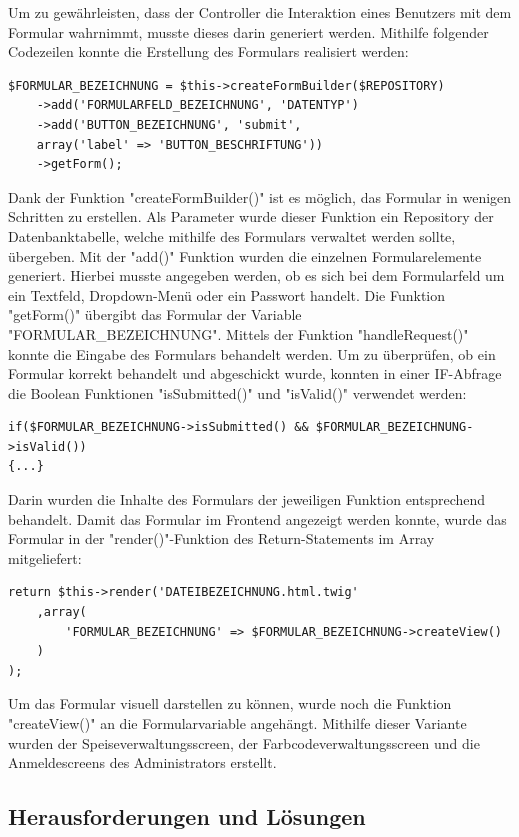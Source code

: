 Um zu gewährleisten, dass der Controller die Interaktion eines Benutzers mit dem Formular wahrnimmt, musste dieses darin generiert werden. Mithilfe folgender Codezeilen konnte die Erstellung des Formulars realisiert werden:
	\lstset{language=php}
  	\begin{lstlisting}
$FORMULAR_BEZEICHNUNG = $this->createFormBuilder($REPOSITORY)
	->add('FORMULARFELD_BEZEICHNUNG', 'DATENTYP')
	->add('BUTTON_BEZEICHNUNG', 'submit',
	array('label' => 'BUTTON_BESCHRIFTUNG'))
    ->getForm();
  	\end{lstlisting}
Dank der Funktion "createFormBuilder()" ist es möglich, das Formular in wenigen Schritten zu erstellen. Als Parameter wurde dieser Funktion ein Repository der Datenbanktabelle, welche mithilfe des Formulars verwaltet werden sollte, übergeben. Mit der "add()" Funktion wurden die einzelnen Formularelemente generiert. Hierbei musste angegeben werden, ob es sich bei dem Formularfeld um ein Textfeld, Dropdown-Menü oder ein Passwort handelt. Die Funktion "getForm()" übergibt das Formular der Variable "FORMULAR\_BEZEICHNUNG".
Mittels der Funktion "handleRequest()" konnte die Eingabe des Formulars behandelt werden. Um zu überprüfen, ob ein Formular korrekt behandelt und abgeschickt wurde, konnten in einer IF-Abfrage die Boolean Funktionen "isSubmitted()" und "isValid()" verwendet werden:
	\lstset{language=php}
  	\begin{lstlisting}
if($FORMULAR_BEZEICHNUNG->isSubmitted() && $FORMULAR_BEZEICHNUNG->isValid())
{...}
  	\end{lstlisting}
Darin wurden die Inhalte des Formulars der jeweiligen Funktion entsprechend behandelt.
Damit das Formular im Frontend angezeigt werden konnte, wurde das Formular in der "render()"-Funktion des Return-Statements im Array mitgeliefert:
	\lstset{language=php}
  	\begin{lstlisting}
return $this->render('DATEIBEZEICHNUNG.html.twig'
    ,array(
    	'FORMULAR_BEZEICHNUNG' => $FORMULAR_BEZEICHNUNG->createView()
    )
);
  	\end{lstlisting}
Um das Formular visuell darstellen zu können, wurde noch die Funktion "createView()" an die Formularvariable angehängt.
Mithilfe dieser Variante wurden der Speiseverwaltungsscreen, der Farbcodeverwaltungsscreen und die Anmeldescreens des Administrators erstellt.

  \subsection{Herausforderungen und Lösungen}

